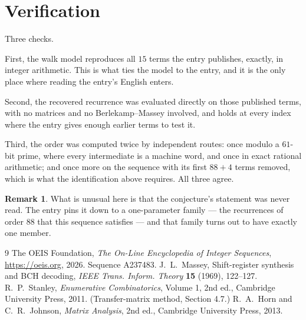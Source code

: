 \documentclass[11pt,a4paper]{article}
\theoremstyle{plain}
\theoremstyle{definition}
\newtheorem{remark}[theorem]{Remark}
\begin{document}
\section{Verification}

Three checks.

First, the walk model reproduces all $15$ terms the entry publishes, exactly, in integer
arithmetic. This is what ties the model to the entry, and it is the only place where reading
the entry's English enters.

Second, the recovered recurrence was evaluated directly on those published terms, with no
matrices and no Berlekamp--Massey involved, and holds at every index where the entry gives
enough earlier terms to test it.

Third, the order was computed twice by independent routes: once modulo a $61$-bit prime, where
every intermediate is a machine word, and once in exact rational arithmetic; and once more on
the sequence with its first $88+4$ terms removed, which is what the identification above
requires. All three agree.

\begin{remark}
What is unusual here is that the conjecture's statement was never read. The entry pins it down
to a one-parameter family --- the recurrences of order $88$ that this sequence satisfies
--- and that family turns out to have exactly one member.
\end{remark}

\begin{thebibliography}{9}
 The OEIS Foundation, \emph{The On-Line Encyclopedia of Integer
Sequences}, \url{https://oeis.org}, 2026. Sequence A237483.
 J.~L.~Massey, Shift-register synthesis and BCH decoding, \emph{IEEE
Trans. Inform. Theory} \textbf{15} (1969), 122--127.
 R.~P.~Stanley, \emph{Enumerative Combinatorics}, Volume 1, 2nd ed.,
Cambridge University Press, 2011. (Transfer-matrix method, Section 4.7.)
 R.~A.~Horn and C.~R.~Johnson, \emph{Matrix Analysis}, 2nd ed., Cambridge
University Press, 2013.
\end{thebibliography}
\end{document}
